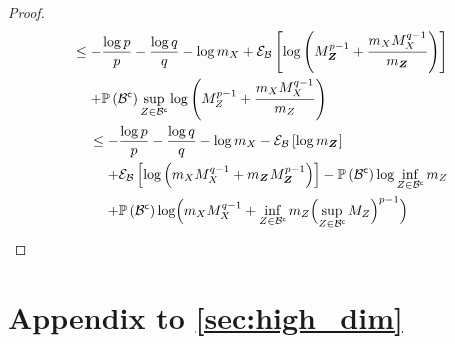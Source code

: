 \begin{proof}
\begin{align*}
		\begin{split}
			& \leq -\frac{\log p}{p}-\frac{\log q}{q}-\log m_{\states{}}+\partialexpectation{\log\left( M_{\observationsRV{}}^{p-1}+\frac{m_{\states{}}M_{\states{}}^{q-1}}{m_{\observationsRV{}}}\right)}{\subSpace}                                        \\
			& \phantomeq+\measure{\stcomp{\subSpace}}\sup_{\observations{}\in\stcomp{\subSpace}}\log\left( M_{\observations{}}^{p-1}+\frac{m_{\states{}}M_{\states{}}^{q-1}}{m_{\observations{}}}\right)
		\end{split} \\
		\begin{split}
			& \leq-\frac{\log p}{p}-\frac{\log q}{q}-\log m_{\states{}}-\partialexpectation{\log m_{\observationsRV{}}}{\subSpace}\\
			&\phantomeq+\partialexpectation{\log\left(m_{\states{}}M_{\states{}}^{q-1}+m_{\observationsRV{}}M_{\observationsRV{}}^{p-1}\right)}{\subSpace}
			-\measure{\stcomp{\subSpace}}\log\inf_{\observations{}\in\stcomp{\subSpace}}m_{\observations{}}\\
			& \phantomeq+\measure{\stcomp{\subSpace}}\log\Bigl( m_{\states{}}M_{\states{}}^{q-1}
			+\inf_{\observations{}\in\stcomp{\subSpace}}m_{\observations{}}\Bigl(\sup_{\observations{}\in\stcomp{\subSpace}}M_{\observations{}}\Bigr)^{p-1}\Bigr)
		\end{split}
	\end{align*}
\end{proof}

\section{Appendix to \autoref{sec:high_dim}}

